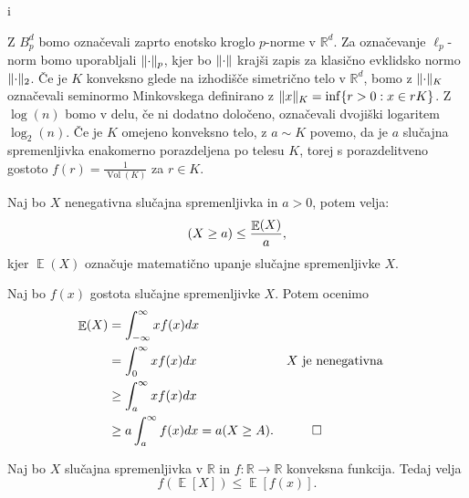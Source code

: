 i\documentclass[mat1]{fmfdelo}
\DeclarePairedDelimiter{\norm}{\lVert}{\rVert}
\newcommand{\R}{\mathbb R}
\let\P\relax \DeclareMathOperator*{\P}{\mathbb P}
\DeclareMathOperator*{\E}{\mathbb E}
\DeclareMathOperator{\Vol}{Vol}
\begin{document}
Z $B_p^d$  bomo označevali zaprto enotsko kroglo $p$-norme v $\R^d$. Za označevanje $\ell_p$-norm bomo uporabljali $\norm{\cdot}_p$, kjer bo $\norm{\cdot}$ krajši zapis za klasično evklidsko normo $\norm{\cdot}_2$. Če je $K$ konveksno glede na izhodišče simetrično telo v $\R^d$, bomo z $\norm{\cdot}_K$ označevali seminormo Minkovskega definirano z $\norm{x}_K=\inf\{r > 0: x\in rK\}$. Z $\log(n)$ bomo v delu, če ni dodatno določeno, označevali dvojiški logaritem $\log_2(n)$. Če je $K$ omejeno konveksno telo, z $a \sim K$ povemo, da je $a$ slučajna spremenljivka enakomerno porazdeljena po telesu $K$, torej s porazdelitveno gostoto $f(r)=\frac{1}{\Vol(K)}$ za $r \in K$.

\begin{izrek}
    Naj bo $X$ nenegativna slučajna spremenljivka in $a>0$, potem velja:
    \begin{equation*}
        \P(X \geq a) \leq \frac{\E(X)}{a},
    \end{equation*}
    kjer $\E(X)$ označuje matematično upanje slučajne spremenljivke $X$.
\end{izrek}
\begin{dokaz}
    Naj bo $f(x)$ gostota slučajne spremenljivke $X$. Potem ocenimo
    \begin{align*}
        \E(X) &= \int_{-\infty}^{\infty} x f(x) dx \\
        &= \int_{0}^{\infty} x f(x) dx && X \text{ je nenegativna} \\
        &\geq \int_{a}^{\infty} x f(x) dx \\
        &\geq a \int_{a}^{\infty} f(x) dx = a \P(X \geq A). && \qedhere
    \end{align*}
\end{dokaz}

\begin{izrek}
    Naj bo $X$ slučajna spremenljivka v $\R$ in $f: \R \to \R$ konveksna funkcija. Tedaj velja
    \begin{equation*}
        f(\E[X]) \leq \E[f(x)].
    \end{equation*}
\end{izrek}
\end{document}
